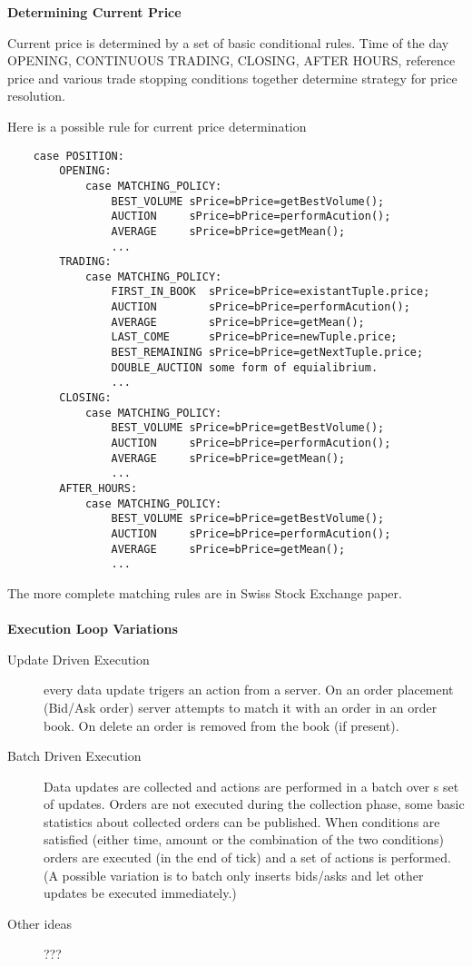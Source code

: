 \documentclass{article}
\begin{document}
{\bf Determining Current Price} 

Current price is determined by a set of basic conditional rules. Time of the day OPENING, CONTINUOUS TRADING, CLOSING, AFTER HOURS, reference price and various trade stopping conditions together determine strategy for price resolution.

Here is a possible rule for current price determination

\begin{program}
    \begin{verbatim}    
    case POSITION:
        OPENING:
            case MATCHING_POLICY:
                BEST_VOLUME sPrice=bPrice=getBestVolume();
                AUCTION     sPrice=bPrice=performAcution();
                AVERAGE     sPrice=bPrice=getMean();
                ...
        TRADING:
            case MATCHING_POLICY:
                FIRST_IN_BOOK  sPrice=bPrice=existantTuple.price;
                AUCTION        sPrice=bPrice=performAcution();
                AVERAGE        sPrice=bPrice=getMean();
                LAST_COME      sPrice=bPrice=newTuple.price;
                BEST_REMAINING sPrice=bPrice=getNextTuple.price;
                DOUBLE_AUCTION some form of equialibrium.
                ...       
        CLOSING:
            case MATCHING_POLICY:
                BEST_VOLUME sPrice=bPrice=getBestVolume();
                AUCTION     sPrice=bPrice=performAcution();
                AVERAGE     sPrice=bPrice=getMean();
                ...
        AFTER_HOURS:
            case MATCHING_POLICY:
                BEST_VOLUME sPrice=bPrice=getBestVolume();
                AUCTION     sPrice=bPrice=performAcution();
                AVERAGE     sPrice=bPrice=getMean();
                ...
    \end{verbatim}
\caption{Price Strategy. }
\end{program}

The more complete matching rules are in Swiss Stock Exchange paper.
\\
\\
{\bf Execution Loop Variations}

\begin{description}
    \item[Update Driven Execution] every data update trigers an action from a server. On an order placement (Bid/Ask order) server attempts to match it with an order in an order book. On delete an order is removed from the book (if present).
    \item[Batch Driven Execution] Data updates are collected and actions are performed in a batch over s set of updates. Orders are not executed during the collection phase, some basic statistics about collected orders can be published. When conditions are satisfied (either time, amount or the combination of the two conditions) orders are executed (in the end of tick) and a set of actions is performed. (A possible variation is to batch only inserts bids/asks and let other updates be executed immediately.)
    \item[Other ideas] ???
\end{description}
\end{document}
